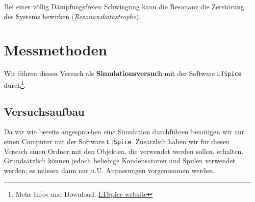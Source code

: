 \documentclass[10pt,a4paper]{article}
\begin{document}
\begin{flushleft}
\begin{itemize}
Bei einer völlig Dämpfungsfreien Schwingung kann die Resonanz die Zerstörung des Systems bewirken (\textit{Resonanzkatastrophe}).
\end{itemize}
\end{flushleft}

\newpage

\section{Messmethoden}
\begin{flushleft}
Wir führen diesen Versuch als \textbf{Simulationsversuch} mit der Software \texttt{LTSpice} durch\footnote{Mehr Infos und Download: \href{https://www.analog.com/en/design-center/design-tools-and-calculators/ltspice-simulator.html}{LTSpice website}}.
\end{flushleft}

\subsection{Versuchsaufbau}
\begin{flushleft}
Da wir wie bereits angesprochen eine Simulation durchführen benötigen wir nur einen Computer mit der Software \texttt{LTSpice}. Zusätzlich haben wir für diesen Versuch einen Ordner mit den Objekten, die verwendet werden sollen, erhalten. Grundsätzlich können jedoch beliebige Kondensatoren und Spulen verwendet werden; es müssen dann nur u.U. Anpassungen vorgenommen werden.
\end{flushleft}
\end{document}
